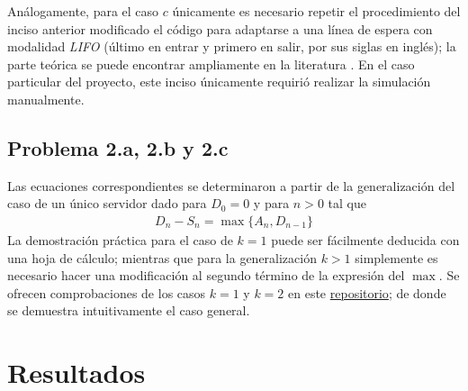 \documentclass[journal]{IEEEtran}
\begin{document}
Análogamente, para el caso $c$ únicamente es necesario repetir el procedimiento del inciso anterior modificado el código para adaptarse a una línea de espera con modalidad \textit{LIFO} (último en entrar y primero en salir, por sus siglas en inglés); la parte teórica se puede encontrar ampliamente en la literatura \cite{ross2013simulation}. En el caso particular del proyecto, este inciso únicamente requirió realizar la simulación manualmente. 

\subsection{Problema 2.a, 2.b y 2.c }

Las ecuaciones correspondientes se determinaron a partir de la generalización del caso de un único servidor dado para $D_0=0$ y para $n>0$ tal que 
\begin{align}
	D_n-S_n=\max\{A_n,D_{n-1}\}
\end{align}
La demostración práctica para el caso de $k=1$ puede ser fácilmente deducida con una hoja de cálculo; mientras que para la generalización $k>1$ simplemente es necesario hacer una modificación al segundo término de la expresión del $\max$. Se ofrecen comprobaciones de los casos $k=1$ y $k=2$ en este \href{https://github.com/RudiksChess/UVG-ModelacionYSimulacion-Notas-6-Semestre/tree/main/Proyecto\%201}{repositorio}; de donde se demuestra intuitivamente el caso general. 
\section{Resultados}
\end{document}
